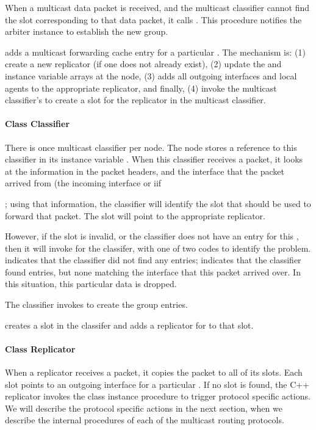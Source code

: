 {When a multicast data packet is received, and the multicast
classifier cannot find the slot corresponding to that data packet,
it calls .
This procedure notifies the arbiter instance to establish the new group.

 adds a multicast forwarding cache entry for
a particular .
The mechanism is:
(1) create a new replicator (if one does not already exist),
(2) update the  and 
 instance variable arrays at the node,
(3) adds all outgoing interfaces and local agents
to the appropriate replicator,
and finally,
(4) invoke the multicast classifier's 
 to create a slot for the replicator in the multicast classifier.

\paragraph{Class Classifier}
There is once multicast classifier per node.
The node stores a reference to this classifier in its instance variable
.
When this classifier receives a packet,
it looks at the  information in the packet headers,
and the interface that the packet arrived from (the incoming interface or iif};
using that information, the classifier will identify the slot
that should be used to forward that packet.  The slot will point
to the appropriate replicator.

However, if the slot is invalid, or the classifier does not have an
entry for this ,
then it will invoke  for the classifer,
with one of two codes to identify the problem.
 indicates that the classifier did not find any
 entries;
 indicates that the classifier found 
entries, but none matching the interface that this packet arrived over.
In this situation, this particular data is dropped.

The classifier  invokes 
to create the group entries.

 creates a slot in the classifer
and adds a replicator for  to that slot.

\paragraph{Class Replicator}
When a replicator receives a packet,
it copies the packet to all of its slots.
Each slot points to an outgoing interface for a particular 
.
If no slot is found, the C++ replicator invokes the class 
instance procedure  to
trigger protocol specific actions.
We will describe the protocol specific actions in the next section,
when we describe the internal procedures of each of the 
multicast routing protocols.

